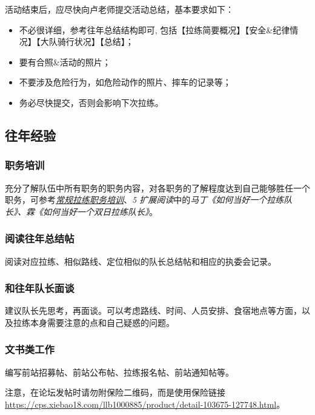 \documentclass[UTF8]{ctexart}
\begin{document}
活动结束后，应尽快向卢老师提交活动总结，基本要求如下：
\begin{itemize}[nosep,left=4em]
    \item 不必很详细，参考往年总结结构即可, 包括【拉练简要概况】【安全\&纪律情况】【大队骑行状况】【总结】；
    \item 要有合照\&活动的照片；
    \item 不要涉及危险行为，如危险动作的照片、摔车的记录等；
    \item 务必尽快提交，否则会影响下次拉练。
\end{itemize}

\subsection{往年经验}

\subsubsection{职务培训}

充分了解队伍中所有职务的职务内容，对各职务的了解程度达到自己能够胜任一个职务，可参考\href{https://chexie.net/bbs/content/?bid=7&tid=1062&p=1}{\textit{常规拉练职务培训}}、{\color{blue}\textit{5 扩展阅读}}中的{\color{blue}\textit{马丁《如何当好一个拉练队长》、霖《如何当好一个双日拉练队长》}}。

\subsubsection{阅读往年总结帖}

阅读对应拉练、相似路线、定位相似的队长总结帖和相应的执委会记录。

\subsubsection{和往年队长面谈}

建议队长先思考，再面谈。可以考虑路线、时间、人员安排、食宿地点等方面，以及拉练本身需要注意的点和自己疑惑的问题。

\subsubsection{文书类工作}

编写前站招募帖、前站公布帖、拉练报名帖、前站通知帖等。

注意，在论坛发帖时请勿附保险二维码，而是使用保险链接\url{https://cps.xiebao18.com/llb1000885/product/detail-103675-127748.html}。
\end{document}
